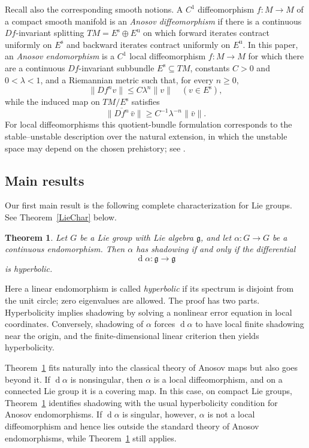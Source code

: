 \documentclass[12pt]{amsart}
\newtheorem{maintheorem}{Theorem}
\theoremstyle{definition}
\numberwithin{equation}{section}
\theoremstyle{remark}
\DeclareMathOperator{\di}{d}
\begin{document}
Recall also the corresponding smooth notions. A $C^1$ diffeomorphism
$f:M\to M$ of a compact smooth manifold is an \emph{Anosov diffeomorphism}
if there is a continuous $Df$-invariant splitting
$TM=E^{\mathrm s}\oplus E^{\mathrm u}$ on which forward iterates contract
uniformly on $E^{\mathrm s}$ and backward iterates contract uniformly on
$E^{\mathrm u}$. In this paper, an \emph{Anosov endomorphism} is a $C^1$
local diffeomorphism $f:M\to M$ for which there are a continuous
$Df$-invariant subbundle $E^{\mathrm s}\subseteq TM$, constants $C>0$ and
$0<\lambda<1$, and a Riemannian metric such that, for every $n\geq 0$,
\[
\|Df^n v\|\leq C\lambda^n\|v\|
\quad(v\in E^{\mathrm s}),
\]
while the induced map on $TM/E^{\mathrm s}$ satisfies
\[
\|\overline{Df^n}\,\bar v\|\geq C^{-1}\lambda^{-n}\|\bar v\|.
\]
For local diffeomorphisms this quotient-bundle formulation corresponds to
the stable--unstable description over the natural extension, in which the
unstable space may depend on the chosen prehistory; see
\cite{ManePugh1975,Przytycki1976,AokiHiraide}.

\subsection{Main results}

Our first main result is the following complete characterization for Lie
groups. See Theorem~\ref{LieChar} below.

\begin{maintheorem}\label{thm:main-lie}
Let $G$ be a Lie group with Lie algebra $\mathfrak g$, and let
$\alpha:G\to G$ be a continuous endomorphism. Then $\alpha$ has shadowing if
and only if the differential
\[
\di\alpha:\mathfrak g\to\mathfrak g
\]
is hyperbolic.
\end{maintheorem}

Here a linear endomorphism is called \emph{hyperbolic} if its spectrum is
disjoint from the unit circle; zero eigenvalues are allowed. The proof has
two parts. Hyperbolicity implies shadowing by solving a nonlinear error
equation in local coordinates. Conversely, shadowing of $\alpha$ forces
$\di\alpha$ to have local finite shadowing near the origin, and the
finite-dimensional linear criterion then yields hyperbolicity.

Theorem~\ref{thm:main-lie} fits naturally into the classical theory of
Anosov maps but also
goes beyond it. If $\di\alpha$ is nonsingular, then $\alpha$ is a local
diffeomorphism, and on a connected Lie group it is a covering map. In this
case, on compact Lie groups, Theorem~\ref{thm:main-lie} identifies shadowing
with the usual
hyperbolicity condition for Anosov endomorphisms. If $\di\alpha$ is
singular, however, $\alpha$ is not a local diffeomorphism and hence lies
outside the standard theory of Anosov endomorphisms, while
Theorem~\ref{thm:main-lie} still applies.
\end{document}

